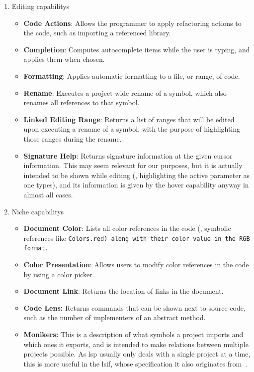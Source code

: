 \documentclass[../thesis]{subfiles}
\begin{document}
\begin{enumerate}
	\item {Editing \glspl{capability}}
	      \begin{itemize}
		      \item \textbf{Code Actions}: Allows the programmer to apply refactoring actions to the code, such as importing a referenced library.
		      \item \textbf{Completion}: Computes autocomplete items while the user is typing, and applies them when chosen.
		      \item \textbf{Formatting}: Applies automatic formatting to a file, or range, of code.
		      \item \textbf{Rename}: Executes a project-wide rename of a symbol, which also renames all references to that symbol.
		      \item \textbf{Linked Editing Range}: Returns a list of \glspl{range} that will be edited upon executing a rename of a symbol, with the purpose of highlighting those ranges during the rename.
		      \item \textbf{Signature Help}: Returns signature information at the given cursor information.
		            This may seem relevant for our purposes, but it is actually intended to be shown while editing (\eg, highlighting the active parameter as one types), and its information is given by the hover \gls{capability} anyway in almost all cases.
	      \end{itemize}
	\item {Niche \glspl{capability}}
	      \begin{itemize}
		      \item \textbf{Document Color}: Lists all color references in the code (\eg, symbolic references like \tt{Colors.red}) along with their color value in the RGB format.
		      \item \textbf{Color Presentation}: Allows users to modify color references in the code by using a color picker.
		      \item \textbf{Document Link}: Returns the location of links in the document.
		      \item \textbf{Code Lens:} Returns commands that can be shown next to source code, such as the number of implementers of an abstract method.
		      \item \textbf{Monikers:} This is a description of what symbols a project imports and which ones it exports, and is intended to make relations between multiple projects possible.
		            As \gls{lsp} usually only deals with a single project at a time, this is more useful in the \gls{lsif}, whose specification it also originates from~\cite{lsif}.

\end{itemize}
\end{enumerate}
\end{document}
